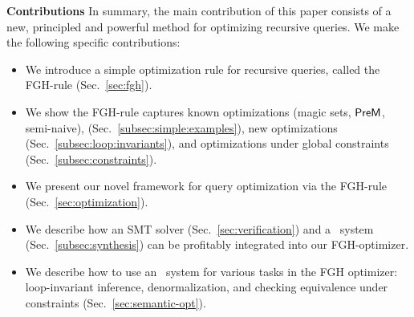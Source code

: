 {\bf Contributions} In summary, the main contribution of this paper
consists of a new, principled and powerful method for optimizing
recursive queries.  We make the following specific contributions:
%
\begin{itemize}
\item We introduce a simple optimization rule for recursive queries,
  called the FGH-rule (Sec.~\ref{sec:fgh}).
\item We show the FGH-rule captures known optimizations (magic
  sets, $\textsf{PreM}$, semi-naive), (Sec.~\ref{subsec:simple:examples}), 
  new optimizations (Sec.~\ref{subsec:loop:invariants}), and
  optimizations under global constraints
  (Sec.~\ref{subsec:constraints}).
\item We present our novel framework for query optimization via
the FGH-rule  (Sec.~\ref{sec:optimization}).
\item We describe how an SMT solver
(Sec.~\ref{sec:verification}) and a
\cegis\ system (Sec.~\ref{subsec:synthesis})
can be profitably integrated into our FGH-optimizer.
\item We describe how to use an \eqsat\ system for various tasks in
  the FGH optimizer: loop-invariant inference, denormalization,
  and checking equivalence under constraints (Sec.~\ref{sec:semantic-opt}).
\end{itemize}

